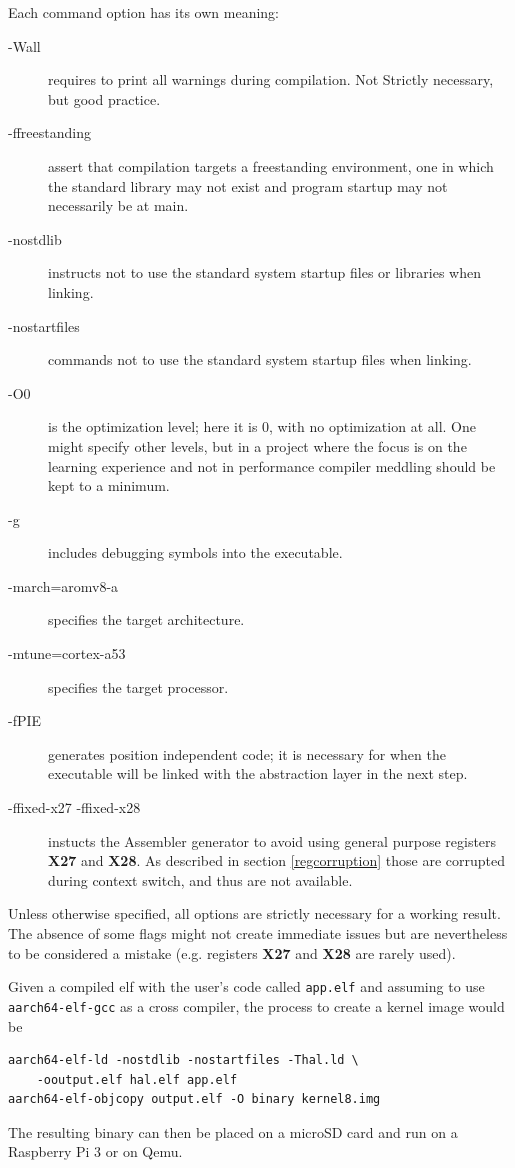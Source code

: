 \documentclass[12pt,a4paper,openright,twoside]{report}
\begin{document}
Each command option has its own meaning:
\begin{description}
    \item[-Wall] requires to print all warnings during compilation. Not Strictly
        necessary, but good practice.
    \item[-ffreestanding] assert that compilation targets a freestanding 
        environment, one in which the standard library may not exist and program 
        startup may not necessarily be at main.
    \item[-nostdlib] instructs not to use the standard system startup files or 
        libraries when linking.
    \item[-nostartfiles] commands not to use the standard system startup 
        files when linking.
    \item[-O0] is the optimization level; here it is 0, with no optimization at all.
        One might specify other levels, but in a project where the focus is on 
        the learning experience and not in performance compiler meddling should 
        be kept to a minimum.
    \item[-g] includes debugging symbols into the executable.
    \item[-march=aromv8-a] specifies the target architecture.
    \item[-mtune=cortex-a53] specifies the target processor.
    \item[-fPIE] generates position independent code; it is necessary for when
        the executable will be linked with the abstraction layer in the next step.
    \item[-ffixed-x27 -ffixed-x28] instucts the Assembler generator to avoid using
        general purpose registers \textbf{X27} and \textbf{X28}. 
        As described in section \ref{regcorruption}
        those are corrupted during context switch, and thus are not available.
\end{description}

Unless otherwise specified, all options are strictly necessary for a working 
result. The absence of some flags might not create immediate issues but are 
nevertheless to be considered a mistake (e.g. registers \textbf{X27} and \textbf{X28}
are rarely used).

Given a compiled elf with the user's code called {\tt app.elf} and assuming to
use {\tt aarch64-elf-gcc} as a cross compiler, the process to create a kernel image
would be 
\begin{lstlisting}
aarch64-elf-ld -nostdlib -nostartfiles -Thal.ld \
    -ooutput.elf hal.elf app.elf                                                                                                                                    
aarch64-elf-objcopy output.elf -O binary kernel8.img
\end{lstlisting}
The resulting binary can then be placed on a microSD card and run on a Raspberry Pi 3
or on Qemu.
\end{document}
